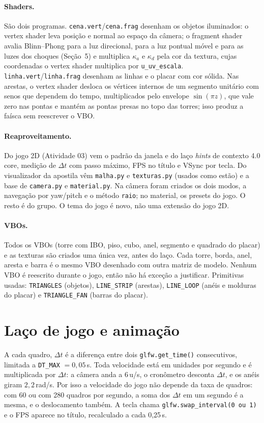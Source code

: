 \documentclass[a4paper,11pt]{article}
\newcommand{\tecla}[1]{\fbox{\footnotesize\ttfamily #1}}
\newcommand{\arq}[1]{\texttt{#1}}
\begin{document}
\paragraph{Shaders.} São dois programas.
\arq{cena.vert}/\arq{cena.frag} desenham os objetos iluminados: o vertex shader
leva posição e normal ao espaço da câmera; o fragment shader avalia Blinn--Phong para a luz direcional, para a luz pontual móvel e para as luzes dos choques (Seção~5) e multiplica $\kappa_a$ e $\kappa_d$ pela cor da textura, cujas coordenadas o vertex shader multiplica por \texttt{u\_uv\_escala}.
\arq{linha.vert}/\arq{linha.frag} desenham as linhas e o placar com cor sólida.
Nas arestas, o vertex shader desloca os vértices internos de um segmento
unitário com senos que dependem do tempo, multiplicados pelo envelope
$\sin(\pi z)$, que vale zero nas pontas e mantém as pontas presas no topo das
torres; isso produz a faísca sem reescrever o VBO.

\paragraph{Reaproveitamento.} Do jogo 2D (Atividade 03) vem o padrão da
janela e do laço \emph{hints} de contexto 4.0 core, medição de $\Delta t$ com
passo máximo, FPS no título e VSync por tecla. Do visualizador da apostila vêm
\arq{malha.py} e \arq{texturas.py} (usados como estão) e a base de
\arq{camera.py} e \arq{material.py}. Na câmera foram criados os dois modos, a
navegação por yaw/pitch e o método \texttt{raio}; no material, os presets do
jogo. O resto é do grupo. O tema do jogo é novo, não uma extensão do jogo 2D.

\paragraph{VBOs.} Todos os VBOs (torre com IBO, piso, cubo, anel, segmento e
quadrado do placar) e as texturas são criados uma única vez, antes do laço.
Cada torre, borda, anel, aresta e barra é o mesmo VBO desenhado com outra matriz
de modelo. Nenhum VBO é reescrito durante o jogo, então não há exceção a
justificar. Primitivas usadas: \texttt{TRIANGLES} (objetos),
\texttt{LINE\_STRIP} (arestas), \texttt{LINE\_LOOP} (anéis e molduras do
placar) e \texttt{TRIANGLE\_FAN} (barras do placar).

\section{Laço de jogo e animação}
A cada quadro, $\Delta t$ é a diferença entre dois \texttt{glfw.get\_time()}
consecutivos, limitada a \texttt{DT\_MAX} $=0{,}05$\,s. Toda velocidade está em
unidades por segundo e é multiplicada por $\Delta t$: a câmera anda a 6\,u/s, o
cronômetro desconta $\Delta t$, e os anéis giram $2{,}2$\,rad/s. Por isso a
velocidade do jogo não depende da taxa de quadros: com 60 ou com 280 quadros
por segundo, a soma dos $\Delta t$ em um segundo é a mesma, e o deslocamento
também. A tecla \tecla{Y} chama
\texttt{glfw.swap\_interval(0 ou 1)} e o FPS aparece no título, recalculado a
cada 0,25\,s.
\end{document}
